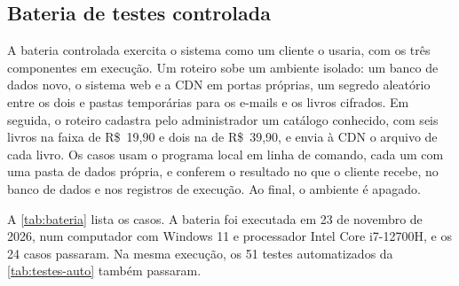 \subsection{Bateria de testes controlada}

A bateria controlada exercita o sistema como um cliente o usaria, com os três
componentes em execução. Um roteiro sobe um ambiente isolado: um banco de dados
novo, o sistema web e a CDN em portas próprias, um segredo aleatório entre os
dois e pastas temporárias para os e-mails e os livros cifrados. Em seguida, o
roteiro cadastra pelo administrador um catálogo conhecido, com seis livros na
faixa de R\$~19,90 e dois na de R\$~39,90, e envia à CDN o arquivo de cada
livro. Os casos usam o programa local em linha de comando, cada um com uma
pasta de dados própria, e conferem o resultado no que o cliente recebe, no
banco de dados e nos registros de execução. Ao final, o ambiente é apagado.

A \autoref{tab:bateria} lista os casos. A bateria foi executada em 23 de
novembro de 2026, num computador com Windows 11 e processador Intel Core
i7-12700H, e os 24 casos passaram. Na mesma execução, os 51 testes
automatizados da \autoref{tab:testes-auto} também passaram.

